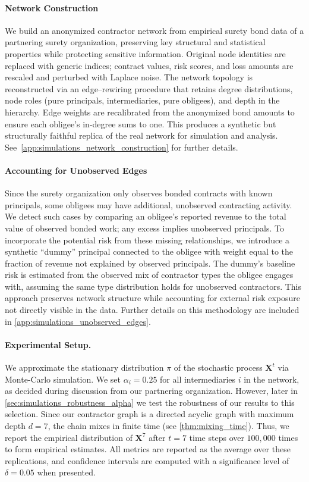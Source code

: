 \documentclass[mnsc,nonblindrev]{informs3}
\newcommand{\Xvec}{\mathbf{X}}
\begin{document}
\paragraph{Network Construction} We build an anonymized contractor network from empirical surety bond data of a partnering surety organization, preserving key structural and statistical properties while protecting sensitive information. Original node identities are replaced with generic indices; contract values, risk scores, and loss amounts are rescaled and perturbed with Laplace noise. The network topology is reconstructed via an edge–rewiring procedure that retains degree distributions, node roles (pure principals, intermediaries, pure obligees), and depth in the hierarchy. Edge weights are recalibrated from the anonymized bond amounts to ensure each obligee’s in-degree sums to one. This produces a synthetic but structurally faithful replica of the real network for simulation and analysis.  See~\cref{app:simulations_network_construction} for further details.




\paragraph{Accounting for Unobserved Edges} Since the surety organization only observes bonded contracts with known principals, some obligees may have additional, unobserved contracting activity. We detect such cases by comparing an obligee’s reported revenue to the total value of observed bonded work; any excess implies unobserved principals. To incorporate the potential risk from these missing relationships, we introduce a synthetic “dummy” principal connected to the obligee with weight equal to the fraction of revenue not explained by observed principals. The dummy’s baseline risk is estimated from the observed mix of contractor types the obligee engages with, assuming the same type distribution holds for unobserved contractors. This approach preserves network structure while accounting for external risk exposure not directly visible in the data.  Further details on this methodology are included in \cref{app:simulations_unobserved_edges}.


\paragraph{Experimental Setup.} We approximate the stationary distribution $\pi$ of the stochastic process $\Xvec^t$ via Monte-Carlo simulation.  We set $\alpha_i = 0.25$ for all intermediaries $i$ in the network, as decided during discussion from our partnering organization. However, later in \cref{sec:simulations_robustness_alpha} we test the robustness of our results to this selection.  Since our contractor graph is a directed acyclic graph with maximum depth $d = 7$, the chain mixes in finite time (see \cref{thm:mixing_time}).  Thus, we report the empirical distribution of $\Xvec^7$ after $t = 7$ time steps over $100,000$ times to form empirical estimates.  All metrics are reported as the average over these replications, and confidence intervals are computed with a significance level of $\delta = 0.05$ when presented.
\end{document}
